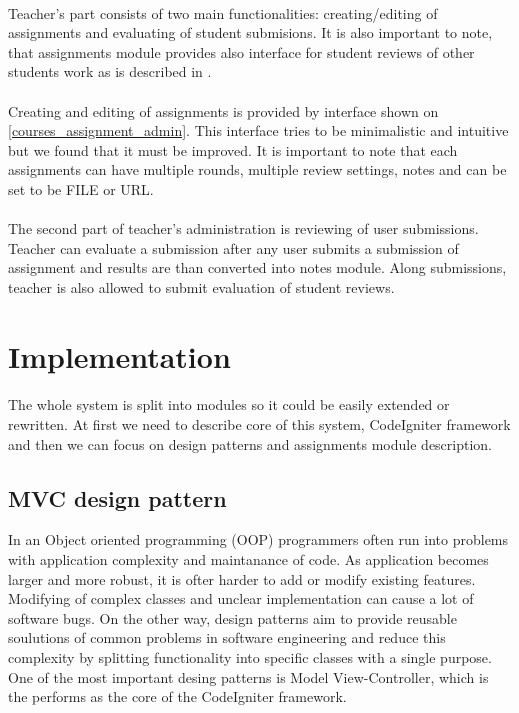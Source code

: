 \paragraph{}
Teacher's part consists of two main functionalities: creating/editing of assignments and evaluating of student submisions. It is also important to note, that assignments module provides also interface for student reviews of other students work as is described in \cite{culik}.

\paragraph{}
Creating and editing of assignments is provided by interface shown on \ref{courses_assignment_admin}. This interface tries to be minimalistic and intuitive but we found that it must be improved. It is important to note that each assignments can have multiple rounds, multiple review settings, notes and can be set to be FILE or URL.

\paragraph{}
The second part of teacher's administration is reviewing of user submissions. Teacher can evaluate a submission after any user submits a submission of assignment and results are than converted into notes module. Along submissions, teacher is also allowed to submit evaluation of student reviews.



\section{Implementation}

\paragraph{}
The whole system is split into modules so it could be easily extended or rewritten. At first we need to describe core of this system, CodeIgniter framework and then we can focus on design patterns and assignments module description.

\subsection{MVC design pattern}
In an Object oriented programming (OOP) programmers often run into problems with application complexity and maintanance of code. As application becomes larger and more robust, it is ofter harder to add or modify existing features. Modifying of complex classes and unclear implementation can cause a lot of software bugs. On the other way, design patterns aim to provide reusable soulutions of common problems in software engineering and reduce this complexity by splitting functionality into specific classes with a single purpose. One of the most important desing patterns is Model
View-Controller, which is the performs as the core of the CodeIgniter framework.

